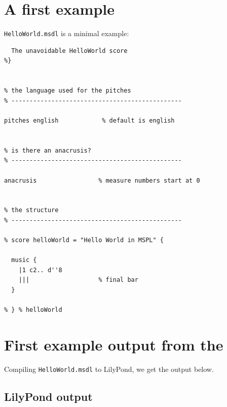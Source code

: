 \section{A first example}

{\tt HelloWorld.msdl} is a minimal example:
\begin{lstlisting}[language=CPlusPlus]
%{
  The unavoidable HelloWorld score
%}


% the language used for the pitches
% -----------------------------------------------

pitches english            % default is english


% is there an anacrusis?
% -----------------------------------------------

anacrusis                 % measure numbers start at 0


% the structure
% -----------------------------------------------

% score helloWorld = "Hello World in MSPL" {

  music {
    |1 c2.. d''8
    |||                   % final bar
  }

% } % helloWorld
\end{lstlisting}


\section{First example output from the \msdLangConv}

Compiling {\tt HelloWorld.msdl} to LilyPond, we get the output below.

\subsection{LilyPond output}

